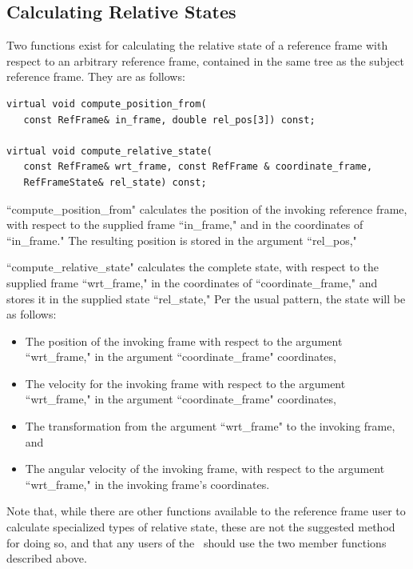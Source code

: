 \subsection{Calculating Relative States}

Two functions exist for calculating the relative state of a reference frame
with respect to an arbitrary reference frame, contained in
the same tree as the subject reference frame. They are as follows:

\begin{verbatim}
virtual void compute_position_from(
   const RefFrame& in_frame, double rel_pos[3]) const;

virtual void compute_relative_state(
   const RefFrame& wrt_frame, const RefFrame & coordinate_frame,
   RefFrameState& rel_state) const;

\end{verbatim}

``compute\_position\_from" calculates the position of the invoking reference
frame, with respect to the supplied frame ``in\_frame," and in the coordinates
of ``in\_frame." The resulting position is stored in the argument ``rel\_pos,"

``compute\_relative\_state" calculates the complete state, with respect to
the supplied frame ``wrt\_frame," in the coordinates of ``coordinate\_frame,"
and stores it in the supplied state ``rel\_state," Per the usual pattern,
the state will be as follows:

\begin{itemize}
\item{The position of the invoking frame with respect to the argument ``wrt\_frame,"
in the argument ``coordinate\_frame" coordinates,}
\item{The velocity for the invoking frame with respect to the argument ``wrt\_frame,"
in the argument ``coordinate\_frame" coordinates,}
\item{The transformation from the argument ``wrt\_frame" to the invoking frame, and}
\item{The angular velocity of the invoking frame, with respect to the
argument ``wrt\_frame," in the invoking frame's coordinates}.
\end{itemize}

Note that, while there are other functions available to the reference frame
user to calculate specialized types of relative state, these are not the
suggested method for doing so, and that any users of the \ should
use the two member functions described above.

